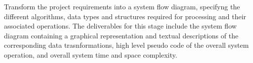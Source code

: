\textnormal{
Transform the project requirements into a system flow diagram, specifyng the different algorithms, data types and structures required for processing and their associated operations.  
The deliverables for this stage include the system flow diagram containing a graphical representation and  textual descriptions of the corresponding data trasnformations, high level pseudo code of the overall system operation, and overall system time and space complexity.}


